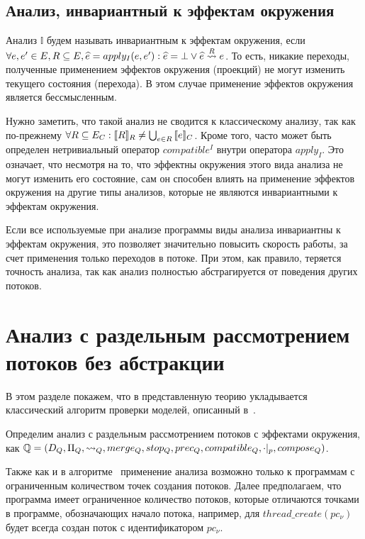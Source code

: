\subsection{Анализ, инвариантный к эффектам окружения}

Анализ $\mathbb{I}$ будем называть инвариантным к эффектам окружения, если $\forall e, e' \in E, R \subseteq E, \widehat{e} = apply_I(e, e'): \widehat{e} = \bot \lor \widehat{e} \stackrel{R}{\leadsto} e$.
То есть, никакие переходы, полученные применением эффектов окружения (проекций) не могут изменить текущего состояния (перехода). 
В этом случае применение эффектов окружения является бессмысленным.

Нужно заметить, что такой анализ не сводится к классическому анализу, так как по-прежнему $\forall R\subseteq E_C: [\![ R ]\!]_R \neq \bigcup_{e\in R}{[\![ e ]\!]_C}$.
Кроме того, часто может быть определен нетривиальный оператор $compatible^{I}$ внутри оператора $apply_I$. 
Это означает, что несмотря на то, что эффектны окружения этого вида анализа не могут изменить его состояние, сам он способен влиять на применение эффектов окружения на другие типы анализов, которые не являются инвариантными к эффектам окружения.

Если все используемые при анализе программы виды анализа инвариантны к эффектам окружения, это позволяет значительно повысить скорость работы, за счет применения только переходов в потоке.
При этом, как правило, теряется точность анализа, так как анализ полностью абстрагируется от поведения других потоков.

\section{Анализ с раздельным рассмотрением потоков без абстракции}

В этом разделе покажем, что в представленную теорию укладывается классический алгоритм проверки моделей, описанный в~\cite{ThreadModular03}.

Определим анализ с раздельным рассмотрением потоков с эффектами окружения, как
$\mathbb{Q}=(D_{Q}, \Pi_{Q}, \leadsto_{Q}, merge_{Q}, stop_{Q}, prec_{Q}, compatible_{Q}, \cdot|_p, compose_Q)$.

Также как и в алгоритме~\cite{ThreadModular03} применение анализа возможно только к программам с ограниченным количеством точек создания потоков. Далее предполагаем, что программа имеет ограниченное количество потоков, которые отличаются точками в программе, обозначающих начало потока, например, для $thread\_create(pc_\nu)$ будет всегда создан поток с идентификатором $pc_\nu$.

